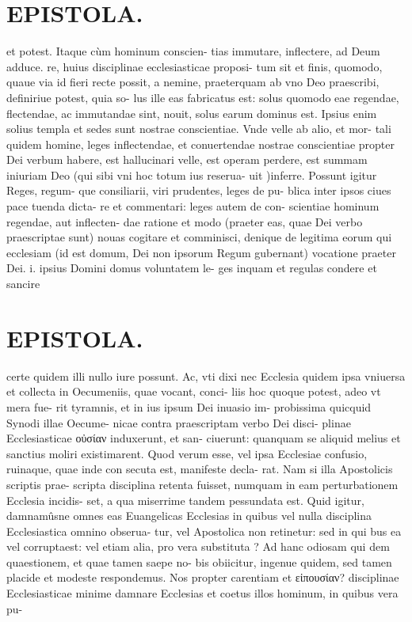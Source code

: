 \documentclass{article}
\begin{document}
\begin{pages}
\section*{EPISTOLA. }\pstart et potest. Itaque cùm hominum conscien- tias immutare, inflectere, ad Deum adduce. re, huius disciplinae ecclesiasticae proposi- tum sit et finis, quomodo, quaue via id fieri recte possit, a nemine, praeterquam ab vno Deo praescribi, definiriue potest, quia so- lus ille eas fabricatus est: solus quomodo eae regendae, flectendae, ac immutandae sint, nouit, solus earum dominus est. Ipsius enim solius templa et sedes sunt nostrae conscientiae. Vnde velle ab alio, et mor- tali quidem homine, leges inflectendae, et conuertendae nostrae conscientiae propter Dei verbum habere, est hallucinari velle, est operam perdere, est summam iniuriam Deo (qui sibi vni hoc totum ius reserua- uit )inferre. Possunt igitur Reges, regum- que consiliarii, viri prudentes, leges de pu- blica inter ipsos ciues pace tuenda dicta- re et commentari: leges autem de con- scientiae hominum regendae, aut inflecten- dae ratione et modo (praeter eas, quae Dei verbo praescriptae sunt) nouas cogitare et comminisci, denique de legitima eorum qui ecclesiam (id est domum, Dei non ipsorum Regum gubernant) vocatione praeter Dei. i. ipsius Domini domus voluntatem le- ges inquam et regulas condere et sancire  \pend
\section*{EPISTOLA. }\pstart certe quidem illi nullo iure possunt. Ac, vti dixi nec Ecclesia quidem ipsa vniuersa et collecta in Oecumeniis, quae vocant, conci- liis hoc quoque potest, adeo vt mera fue- rit tyramnis, et in ius ipsum Dei inuasio im- probissima quicquid Synodi illae Oecume- nicae contra praescriptam verbo Dei disci- plinae Ecclesiasticae οὐσίαν induxerunt, et san- ciuerunt: quanquam se aliquid melius et sanctius moliri existimarent. Quod verum esse, vel ipsa Ecclesiae confusio, ruinaque, quae inde con secuta est, manifeste decla- rat. Nam si illa Apostolicis scriptis prae- scripta disciplina retenta fuisset, numquam in eam perturbationem Ecclesia incidis- set, a qua miserrime tandem pessundata est. Quid igitur, damnamûsne omnes eas Euangelicas Ecclesias in quibus vel nulla disciplina Ecclesiastica omnino obserua- tur, vel Apostolica non retinetur: sed in qui bus ea vel corruptaest: vel etiam alia, pro vera substituta ? Ad hanc odiosam qui dem quaestionem, et quae tamen saepe no- bis obiicitur, ingenue quidem, sed tamen placide et modeste respondemus. Nos propter carentiam et εἰπουσίαν? disciplinae Ecclesiasticae minime damnare Ecclesias et coetus illos hominum, in quibus vera pu-  \pend

\end{pages}
\end{document}
